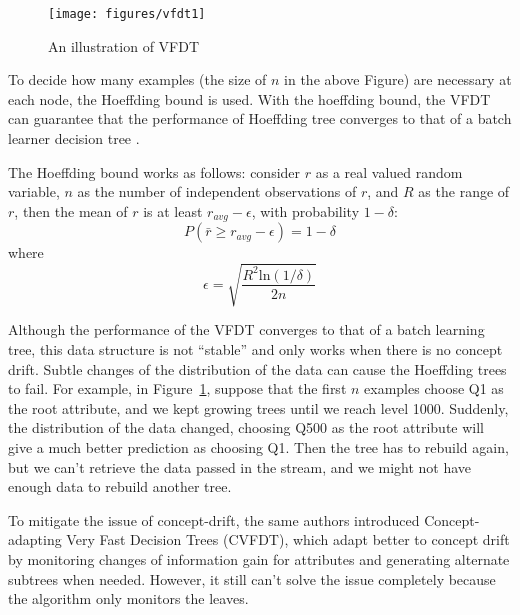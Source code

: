 \documentclass[conference]{IEEEtran}
\begin{document}
		\begin{figure}[H]
			\centering
			\texttt{[image: figures/vfdt1]} 
			\caption{An illustration of VFDT}
			\label{fig:VFDT}
		\end{figure}
		To decide how many examples (the size of $n$ in the above Figure) are necessary at each node, the Hoeffding bound is used. With the hoeffding bound, the VFDT can guarantee that the performance of Hoeffding tree converges to that of a batch learner decision tree \cite{VFDT}.
		
		The Hoeffding bound works as follows: consider $r$ as a real valued random variable, $n$ as the number of independent observations of $r$, and $R$ as the range of $r$, then the mean of $r$ is at least $r_{avg}-\epsilon$, with probability $1-\delta$: 
		$$P(\bar{r} \geq r_{avg}-\epsilon) = 1-\delta$$ where $$ \epsilon=\sqrt{\frac{R^2 \text{ln}(1/\delta)}{2n}}$$
		
		Although the performance of the VFDT converges to that of a batch learning tree, this data structure is not ``stable'' and only works when there is no concept drift. Subtle changes of the distribution of the data can cause the Hoeffding trees to fail. For example, in Figure~\ref{fig:VFDT}, suppose that the first $n$ examples choose Q1 as the root attribute, and we kept growing trees until we reach level 1000. Suddenly, the distribution of the data changed, choosing Q500 as the root attribute will give a much better prediction as choosing Q1. Then the tree has to rebuild again, but we can't retrieve the data passed in the stream, and we might not have enough data to rebuild another tree.
		
		To mitigate the issue of concept-drift, the same authors introduced Concept-adapting Very Fast Decision Trees (CVFDT), which adapt better to concept drift by monitoring changes of information gain for attributes and generating alternate subtrees when needed. However, it still can't solve the issue completely because the algorithm only monitors the leaves.
		
		
\end{document}
